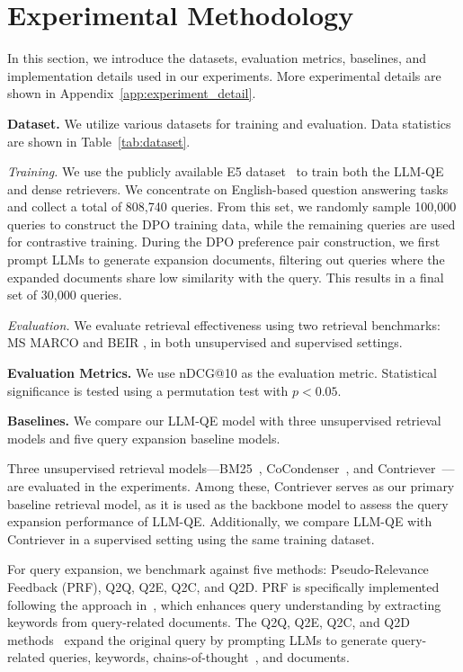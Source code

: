 

\section{Experimental Methodology}\label{sec:exp}
In this section, we introduce the datasets, evaluation metrics, baselines, and implementation details used in our experiments. More experimental details are shown in Appendix~\ref{app:experiment_detail}.

\textbf{Dataset.}
We utilize various datasets for training and evaluation. Data statistics are shown in Table~\ref{tab:dataset}.

\textit{Training.}
We use the publicly available E5 dataset~\cite{wang2024improving,springer2024repetition} to train both the LLM-QE and dense retrievers. We concentrate on English-based question answering tasks and collect a total of 808,740 queries. From this set, we randomly sample 100,000 queries to construct the DPO training data, while the remaining queries are used for contrastive training. During the DPO preference pair construction, we first prompt LLMs to generate expansion documents, filtering out queries where the expanded documents share low similarity with the query. This results in a final set of 30,000 queries.

\textit{Evaluation.}
We evaluate retrieval effectiveness using two retrieval benchmarks: MS MARCO \cite{bajaj2016ms} and BEIR \cite{thakur2021beir}, in both unsupervised and supervised settings.

\textbf{Evaluation Metrics.}
We use nDCG@10 as the evaluation metric. Statistical significance is tested using a permutation test with $p<0.05$.

\textbf{Baselines.} We compare our LLM-QE model with three unsupervised retrieval models and five query expansion baseline models.

Three unsupervised retrieval models—BM25~\cite{robertson2009probabilistic}, CoCondenser~\cite{gao2022unsupervised}, and Contriever~\cite{izacard2021unsupervised}—are evaluated in the experiments. Among these, Contriever serves as our primary baseline retrieval model, as it is used as the backbone model to assess the query expansion performance of LLM-QE. Additionally, we compare LLM-QE with Contriever in a supervised setting using the same training dataset.

For query expansion, we benchmark against five methods: Pseudo-Relevance Feedback (PRF), Q2Q, Q2E, Q2C, and Q2D. PRF is specifically implemented following the approach in~\citet{yu2021improving}, which enhances query understanding by extracting keywords from query-related documents. The Q2Q, Q2E, Q2C, and Q2D methods~\cite{jagerman2023query,li2024can} expand the original query by prompting LLMs to generate query-related queries, keywords, chains-of-thought~\cite{wei2022chain}, and documents.


